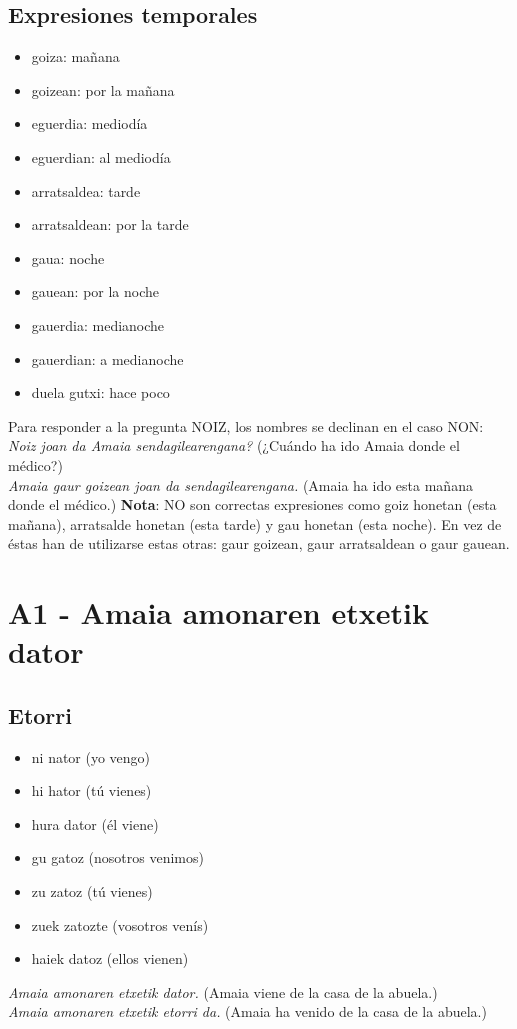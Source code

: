 \documentclass[11pt, a4paper]{article}
\begin{document}
\subsection{Expresiones temporales}
\begin{multicols}{2}
\begin{itemize}
\item goiza: mañana
\item goizean: por la mañana
\item eguerdia: mediodía
\item eguerdian: al mediodía
\item arratsaldea: tarde
\item arratsaldean: por la tarde
\item gaua: noche
\item gauean: por la noche
\item gauerdia: medianoche
\item gauerdian: a medianoche
\item duela gutxi: hace poco
\end{itemize}
\end{multicols}
\noindent Para responder a la pregunta NOIZ, los nombres se declinan en el caso NON:\\
\indent \textit{Noiz joan da Amaia sendagilearengana?} (¿Cuándo ha ido Amaia donde el médico?)\\
\indent \textit{Amaia gaur goizean joan da sendagilearengana.} (Amaia ha ido esta mañana donde el médico.)
\noindent \textbf{Nota}: NO son correctas expresiones como goiz honetan (esta mañana), arratsalde honetan (esta tarde) y gau honetan (esta noche). En vez de éstas han de utilizarse estas otras: gaur goizean, gaur arratsaldean o gaur gauean.

\section{A1 - Amaia amonaren etxetik dator}
\subsection{Etorri}
\begin{multicols}{2}
\begin{itemize}
\item ni nator (yo vengo)
\item hi hator (tú vienes)
\item hura dator (él viene)\\
\item gu gatoz (nosotros venimos)
\item zu zatoz (tú vienes)
\item zuek zatozte (vosotros venís)
\item haiek datoz (ellos vienen)
\end{itemize}
\end{multicols}
\indent \textit{Amaia amonaren etxetik dator.} (Amaia viene de la casa de la abuela.)\\
\indent \textit{Amaia amonaren etxetik etorri da.} (Amaia ha venido de la casa de la abuela.)
\end{document}
